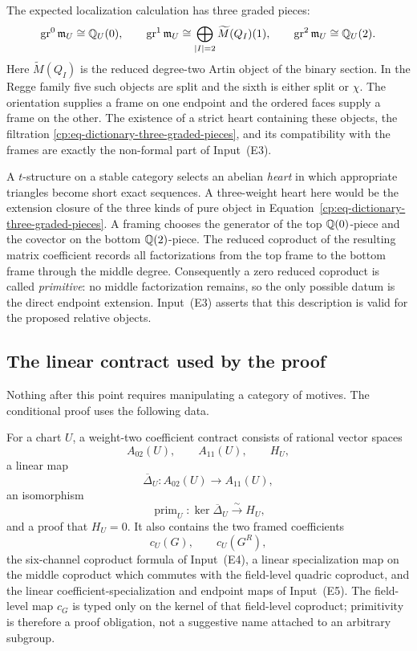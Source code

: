 The expected localization calculation has three graded pieces:
\begin{equation}
 \operatorname{gr}^0\mathfrak m_U\cong\mathbb Q_U(0),\qquad
 \operatorname{gr}^1\mathfrak m_U\cong
   \bigoplus_{|I|=2}\widetilde M(Q_I)(1),\qquad
 \operatorname{gr}^2\mathfrak m_U\cong\mathbb Q_U(2).
 \label{cp:eq-dictionary-three-graded-pieces}
\end{equation}
Here \(\widetilde M(Q_I)\) is the reduced degree-two Artin object of the
binary section.  In the Regge family five such objects are split and the
sixth is either split or \(\chi\).  The orientation supplies a frame on one
endpoint and the ordered faces supply a frame on the other.  The existence
of a strict heart containing these objects, the filtration
\eqref{cp:eq-dictionary-three-graded-pieces}, and its compatibility with
the frames are exactly the non-formal part of Input~\textup{(E3)}.

A \(t\)-structure on a stable category selects an abelian \emph{heart} in which
appropriate triangles become short exact sequences.  A three-weight heart
here would be the extension closure of the three kinds of pure object in
Equation~\eqref{cp:eq-dictionary-three-graded-pieces}.  A framing chooses
the generator of the top \(\mathbb Q(0)\)-piece and the covector on the bottom
\(\mathbb Q(2)\)-piece.  The reduced coproduct of the resulting matrix coefficient
records all factorizations from the top frame to the bottom frame through
the middle degree.  Consequently a zero reduced coproduct is called
\emph{primitive}: no middle factorization remains, so the only possible
datum is the direct endpoint extension.  Input~\textup{(E3)} asserts that
this description is valid for the proposed relative objects.

\subsection{The linear contract used by the proof}
\label{cp:subsec-linear-contract}

Nothing after this point requires manipulating a category of motives.  The
conditional proof uses the following data.

\begin{definition}
\label{cp:def-coefficient-contract}
For a chart \(U\), a weight-two coefficient contract consists of rational
vector spaces
\[
 A_{02}(U),\qquad A_{11}(U),\qquad H_U,
\]
a linear map
\[
 \overline\Delta_U:A_{02}(U)\longrightarrow A_{11}(U),
\]
an isomorphism
\begin{equation}
 \operatorname{prim}_U:
 \ker\overline\Delta_U\xrightarrow{\sim}H_U,
 \label{cp:eq-primitive-is-ext}
\end{equation}
and a proof that \(H_U=0\).  It also contains the two framed coefficients
\[
 c_U(G),\qquad c_U(G^R),
\]
the six-channel coproduct formula of Input~\textup{(E4)}, a linear
specialization map on the middle coproduct which commutes with the
field-level quadric coproduct, and the linear coefficient-specialization and
endpoint maps of Input~\textup{(E5)}.  The field-level map \(c_G\) is typed
only on the kernel of that field-level coproduct; primitivity is therefore a
proof obligation, not a suggestive name attached to an arbitrary subgroup.
\end{definition}

